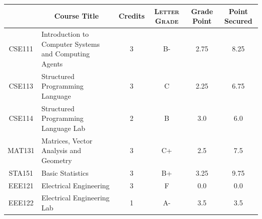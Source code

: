 \documentclass[11pt]{article}
\newcommand*{\numtwo}[1]{\pgfmathprintnumber[
                    fixed, precision=2, fixed zerofill=true]{#1}}
\begin{document}
                \begin{center}
                    \renewcommand{\arraystretch}{1.08}
                    
                \begin{tabular}{|c|l|c|>{\scshape}c|c|c|}
                \hline  \rule[-1ex]{0pt}{3.5ex} {\centering{\bf Course Code}} &  \multicolumn{1}{c|}{\textbf{Course Title}}  & {\bf Credits} & {\bf Letter Grade} & {\bf Grade Point} & {\bf Point Secured}  \\ 
                \hline   CSE111 &  Introduction to Computer Systems and Computing Agents		 & 3 & B- & 2.75 & 8.25 \\ %
                \hline   CSE113 &  Structured Programming Language		 & 3 & C & 2.25 & 6.75 \\ %
                \hline   CSE114 &  Structured Programming Language Lab		 & 2 & B & 3.0 & 6.0 \\ %
                \hline   MAT131 &  Matrices, Vector Analysis and Geometry		 & 3 & C+ & 2.5 & 7.5 \\ %
                \hline   STA151 &  Basic Statistics		 & 3 & B+ & 3.25 & 9.75 \\ %
                \hline   EEE121 &  Electrical Engineering		 & 3 & F & 0.0 & 0.0 \\ %
                \hline   EEE122 &  Electrical Engineering Lab		 & 1 & A- & 3.5 & 3.5 \\ %

\hline                %
                \end{tabular}
                \end{center}
                \renewcommand{\arraystretch}{1.03}
\end{document}
